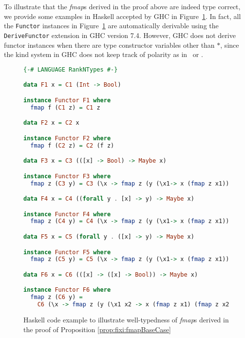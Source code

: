 To illustrate that the \textit{fmap}s derived in the proof above are indeed
type correct, we provide some examples in Haskell accepted by GHC in
Figure~\ref{fig:deriveFunctor}. In fact, all the \texttt{\small Functor}
instances in Figure~\ref{fig:deriveFunctor} are automatically derivable
using the \texttt{\small DeriveFunctor} extension in GHC version 7.4.
However, GHC does not derive functor instances when there are
type constructor variables other than $*$, since the kind system in GHC
does not keep track of polarity as in \Fixw\ or \Fixi.
\begin{figure}
\begin{singlespace}
\begin{lstlisting}[basicstyle={\ttfamily\small},language=Haskell,mathescape]
{-# LANGUAGE RankNTypes #-}

data F1 x = C1 (Int -> Bool)

instance Functor F1 where
  fmap f (C1 z) = C1 z

data F2 x = C2 x

instance Functor F2 where
  fmap f (C2 z) = C2 (f z)

data F3 x = C3 (([x] -> Bool) -> Maybe x)

instance Functor F3 where
  fmap z (C3 y) = C3 (\x -> fmap z (y (\x1-> x (fmap z x1))))

data F4 x = C4 ((forall y . [x] -> y) -> Maybe x)

instance Functor F4 where
  fmap z (C4 y) = C4 (\x -> fmap z (y (\x1-> x (fmap z x1))))

data F5 x = C5 (forall y . ([x] -> y) -> Maybe x)

instance Functor F5 where
  fmap z (C5 y) = C5 (\x -> fmap z (y (\x1-> x (fmap z x1))))

data F6 x = C6 (([x] -> ([x] -> Bool)) -> Maybe x)

instance Functor F6 where
  fmap z (C6 y) =
    C6 (\x -> fmap z (y (\x1 x2 -> x (fmap z x1) (fmap z x2))))
\end{lstlisting}
\end{singlespace}
\caption{Haskell code example to illustrate well-typedness of \textit{fmap}s
        derived in the proof of Proposition \ref{prop:fixi:fmapBaseCase}}
\label{fig:deriveFunctor}
\end{figure}

